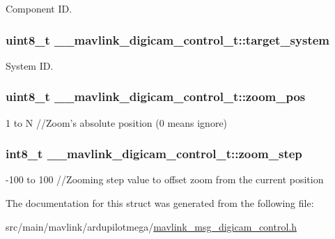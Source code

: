 Component I\+D. 

\hypertarget{struct____mavlink__digicam__control__t_a934cd12cf8f6d0e49aeeec433bef503f}{
\subsubsection[{target\+\_\+system}]{\setlength{\rightskip}{0pt plus 5cm}uint8\+\_\+t \+\_\+\+\_\+mavlink\+\_\+digicam\+\_\+control\+\_\+t\+::target\+\_\+system}}\label{struct____mavlink__digicam__control__t_a934cd12cf8f6d0e49aeeec433bef503f}


System I\+D. 

\hypertarget{struct____mavlink__digicam__control__t_aafd3d960b150853d157257cde74d8cfa}{
\subsubsection[{zoom\+\_\+pos}]{\setlength{\rightskip}{0pt plus 5cm}uint8\+\_\+t \+\_\+\+\_\+mavlink\+\_\+digicam\+\_\+control\+\_\+t\+::zoom\+\_\+pos}}\label{struct____mavlink__digicam__control__t_aafd3d960b150853d157257cde74d8cfa}


1 to N //\+Zoom's absolute position (0 means ignore) 

\hypertarget{struct____mavlink__digicam__control__t_a348697e63bf346dd8e2d028b2a401dd0}{
\subsubsection[{zoom\+\_\+step}]{\setlength{\rightskip}{0pt plus 5cm}int8\+\_\+t \+\_\+\+\_\+mavlink\+\_\+digicam\+\_\+control\+\_\+t\+::zoom\+\_\+step}}\label{struct____mavlink__digicam__control__t_a348697e63bf346dd8e2d028b2a401dd0}


-\/100 to 100 //\+Zooming step value to offset zoom from the current position 



The documentation for this struct was generated from the following file\+:\begin{DoxyCompactItemize}
\item 
src/main/mavlink/ardupilotmega/\hyperlink{mavlink__msg__digicam__control_8h}{mavlink\+\_\+msg\+\_\+digicam\+\_\+control.\+h}\end{DoxyCompactItemize}
